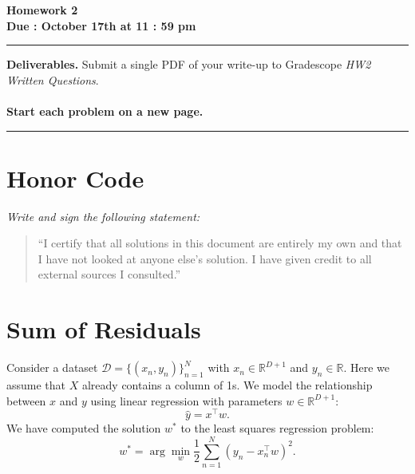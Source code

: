 \documentclass[11pt]{article}
\begin{document}
\begin{center}
    {\huge\bfseries Homework 2}\\[4pt]
    \textbf{Due : October 17th at 11 : 59 pm}\\
\end{center}

\vspace{0.5em}\hrule\vspace{1em}

\noindent\textbf{Deliverables.} Submit a single PDF of your write-up to Gradescope \emph{HW2 Written Questions}. 
\\
\\
\noindent\textbf{Start each problem on a new page.}


\vspace{0.5em}\hrule\vspace{0.75em}


\section*{Honor Code}

\noindent\emph{Write and sign the following statement:}

\begin{quote}\small
“I certify that all solutions in this document are entirely my own and that I have
not looked at anyone else’s solution. I have given credit to all external
sources I consulted.”
\end{quote}

\newpage

\section{Sum of Residuals}
Consider a dataset $\mathcal{D} = \{(x_n, y_n)\}_{n=1}^N$ with $x_n \in \mathbb{R}^{D+1}$ and $y_n \in \mathbb{R}$.  
Here we assume that $X$ already contains a column of 1s.
We model the relationship between $x$ and $y$ using linear regression with parameters $w \in \mathbb{R}^{D+1}$:  
\[
\hat{y} = x^\top w.
\]
We have computed the solution $w^\ast$ to the least squares regression problem:
\[
    w^\ast = \arg \min_{w} \frac{1}{2}\sum_{n=1}^N \left( y_n - x_n^\top w\right)^2.
\]
\end{document}

